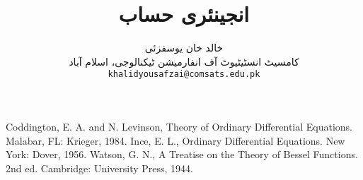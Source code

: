 \documentclass[leqno,b5paper]{book}
\author{
خالد خان یوسفزئی\\
{\small {کامسیٹ انسٹیٹیوٹ آف انفارمیشن ٹیکنالوجی، اسلام آباد}}\\
\texttt{khalidyousafzai@comsats.edu.pk}
}
\title{انجینئری حساب}
\date{}                           %
\begin{document}
\begin{urdufont}


\renewcommand*{\contentsname}{عنوان}    %
\renewcommand*{\proofname}{ثبوت}   %
\renewcommand*{\appendixname}{ضمیمہ}


\frontmatter                          %

\maketitle

\tableofcontents
\pagestyle{empty}
\newpage

\newpage

%


\mainmatter                      %
\renewcommand*{\chaptername}{باب}

\pagestyle{headings}













\renewcommand*{\bibname}{حوالہ}      %
\begin{thebibliography}{99}\label{حوالہ_بیرونی_مواد}
\begin{otherlanguage}{english}
 Coddington, E. A. and N. Levinson, Theory of
Ordinary Differential Equations. Malabar, FL: Krieger,
1984.
Ince, E. L., Ordinary Differential Equations. New
York: Dover, 1956.
Watson, G. N., A Treatise on the Theory of Bessel Functions. 2nd ed. Cambridge: University Press, 1944.
\end{otherlanguage}
\end{thebibliography}
\appendix


%


\end{urdufont}
\end{document}

